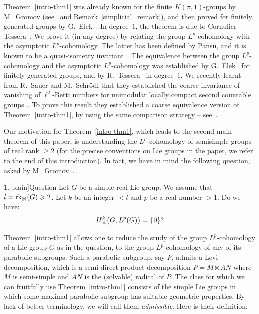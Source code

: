 \documentclass[11pt]{article}
\theoremstyle{definition}
\newcommand{\enoncename}{}
\newtheorem{corpusenonce}[theo]{\enoncename}
\newenvironment{enonce}[1]{\renewcommand{\enoncename}{#1}\begin{corpusenonce}}{\end{corpusenonce}}
\numberwithin{equation}{section}
\numberwithin{figure}{section}
\numberwithin{table}{section}
\DeclareMathOperator{\ct}{ct}
\DeclareMathOperator{\rk}{rk}
\begin{document}
Theorem~\ref{intro-thm1} was already known for the finite $K(\pi, 1)$-groups by M.~Gromov (see~\cite[p.~219]{G} and Remark~\ref{simplicial_remark}), and then proved for finitely generated groups by G.~Elek~\cite{Elek}. In degree~$1$, the theorem is due to Cornulier--Tessera~\cite{CT}. We prove it (in any degree) by relating the group $L^p$-cohomology with the asymptotic $L^p$-cohomology. The latter has been defined by Pansu, and it is known to be a quasi-isometry invariant~\cite{Pa95}. The equivalence between the group $L^p$-cohomology and the asymptotic $L^p$-cohomology was established by G.~Elek~\cite{Elek} for finitely generated groups, and by R.~Tessera~\cite{T} in degree~$1$. We recently learnt from R.~Sauer and M.~Schr\"odl that they established the coarse invariance of vanishing of $\ell^2$-Betti numbers for unimodular locally compact second countable groups~\cite{SaSc}. To prove this result they established a coarse equivalence version of Theorem~\ref{intro-thm1}, by using the same comparison strategy -- see~\cite[Theorem~12]{SaSc}.

Our motivation for Theorem~\ref{intro-thm1}, which leads to the second main theorem of this paper, is understanding the $L^p$-cohomology of semisimple groups of real rank $\geqslant 2$ (for the precise conventions on Lie groups in the paper, we refer to the end of this introduction). In fact, we have in mind the following question, asked by M.~Gromov~\cite[p.~253]{G}.


\begin{enonce}[plain]{Question}
Let $G$ be a simple real Lie group. We assume that $l=\rk_{\bf R} (G)\linebreak\geqslant 2$. Let $k$ be an integer $<l$ and $p$ be a real number $>1$. Do we have:
\[
{\rm H}^k_{\ct} \bigl(G, L^p(G) \bigr) = \{0\}?
\]
\end{enonce}


Theorem~\ref{intro-thm1} allows one to reduce the study of the group $L^p$-cohomology of a Lie group $G$ as in the question, to the group $L^p$-cohomology of any of its parabolic subgroups. Such a parabolic subgroup, say $P$, admits a Levi decomposition, which is a semi-direct product decomposition $P = M \ltimes AN$ where $M$ is semi-simple and $AN$ is the (solvable) radical of $P$. The class for which we can fruitfully use Theorem~\ref{intro-thm1} consists of the simple Lie groups in which some maximal parabolic subgroup has suitable geometric properties. By lack of better terminology, we will call them \emph{admissible}. Here is their definition:
\end{document}
